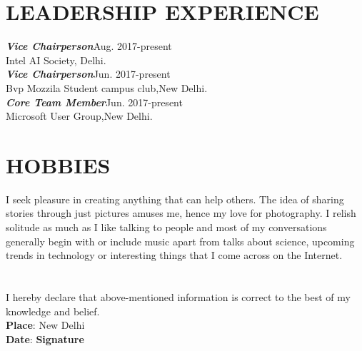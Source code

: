 \documentclass[margin, 10pt]{res}
\begin{document}
\begin{resume}
    
    \section{LEADERSHIP EXPERIENCE}
    {\sl {\bf Vice Chairperson}}\hfill Aug. 2017-present \\
     Intel AI Society, Delhi.\\
    {\sl {\bf Vice Chairperson}}\hfill Jun. 2017-present \\
     Bvp Mozzila Student campus club,New Delhi.\\ 
    {\sl {\bf Core Team Member}}\hfill Jun. 2017-present \\
     Microsoft User Group,New Delhi.\\ 
    

    
    \section{HOBBIES}
    I seek pleasure in creating anything that can help others. The idea of sharing stories through just pictures amuses me, hence my love for photography. I relish solitude as much as I like talking to people and most of my conversations generally begin with or include music apart from talks about science, upcoming trends in technology or interesting things that I come across on the Internet.
    \\

    \section{}
    I hereby declare that above-mentioned information is correct to the best of my knowledge and belief.\\

    {\bf Place}: New Delhi\\
    {\bf Date}: \null\hfill {\bf Signature}\\
    \end{resume}
    
\end{document}
